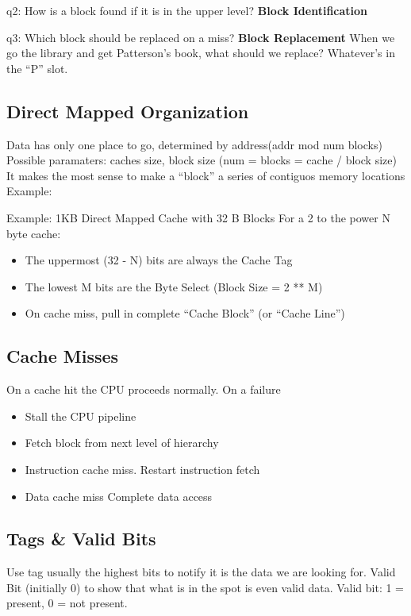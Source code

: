 q2: How is a block found if it is in the upper level?\newline
\textbf{Block Identification} \newline

q3: Which block should be replaced on a miss?\newline
\textbf{Block Replacement} \newline
When we go the library and get Patterson's book, what should we replace?
Whatever's in the ``P'' slot.

\subsection{Direct Mapped Organization}
Data has only one place to go, determined by address(addr mod num blocks)
Possible paramaters: caches size, block size (num = blocks = cache / block size)
It makes the most sense to make a ``block'' a series of contiguos memory locations
Example:\newline

Example: 1KB Direct Mapped Cache with 32 B Blocks \newline
For a 2 to the power N byte cache:
\begin{itemize}
\item The uppermost (32 - N) bits are always the Cache Tag
\item The lowest M bits are the Byte Select (Block Size = 2 ** M)
\item On cache miss, pull in complete ``Cache Block'' (or ``Cache Line'')
\end{itemize}

\subsection{Cache Misses}
On a cache hit the CPU proceeds normally. On a failure \newline
\begin{itemize}
\item Stall the CPU pipeline
\item Fetch block from next level of hierarchy
\item Instruction cache miss. 
\subitem Restart instruction fetch
\item Data cache miss
\subitem Complete data access
\end{itemize}

\subsection{Tags \& Valid Bits}
Use tag usually the highest bits to notify it is the data we are looking for.
Valid Bit (initially 0) to show that what is in the spot is even valid data.
Valid bit: 1 = present, 0 = not present.

